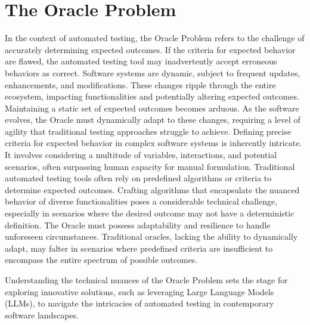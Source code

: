 \section{The Oracle Problem}
\label{sec:oracle_problem}
\vspace{0.2 cm}

In the context of automated testing, the Oracle Problem refers to the challenge of accurately determining expected outcomes. If the criteria for expected behavior are flawed, the automated testing tool may inadvertently accept erroneous behaviors as correct. 
Software systems are dynamic, subject to frequent updates, enhancements, and modifications. These changes ripple through the entire ecosystem, impacting functionalities and potentially altering expected outcomes. Maintaining a static set of expected outcomes becomes arduous. As the software evolves, the Oracle must dynamically adapt to these changes, requiring a level of agility that traditional testing approaches struggle to achieve. Defining precise criteria for expected behavior in complex software systems is inherently intricate. It involves considering a multitude of variables, interactions, and potential scenarios, often surpassing human capacity for manual formulation. Traditional automated testing tools often rely on predefined algorithms or criteria to determine expected outcomes. Crafting algorithms that encapsulate the nuanced behavior of diverse functionalities poses a considerable technical challenge, especially in scenarios where the desired outcome may not have a deterministic definition. The Oracle must possess adaptability and resilience to handle unforeseen circumstances. Traditional oracles, lacking the ability to dynamically adapt, may falter in scenarios where predefined criteria are insufficient to encompass the entire spectrum of possible outcomes\cite{}.

Understanding the technical nuances of the Oracle Problem sets the stage for exploring innovative solutions, such as leveraging Large Language Models (LLMs), to navigate the intricacies of automated testing in contemporary software landscapes.